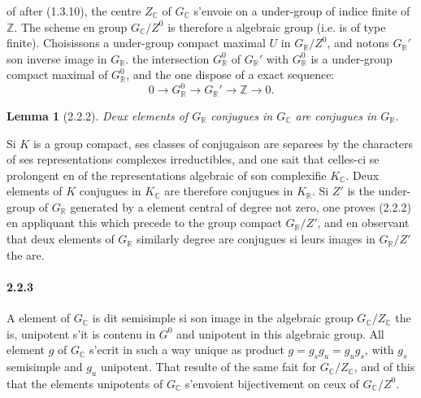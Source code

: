 \documentclass[12pt,a4paper]{article}
\theoremstyle{plain}
\newtheorem{lemma}[theorem]{Lemma}
\theoremstyle{definition}
\theoremstyle{remark}
\newcommand{\CC}{{\mathbb{C}}}
\newcommand{\RR}{{\mathbb{R}}}
\newcommand{\ZZ}{{\mathbb{Z}}}
\begin{document}
of after (1.3.10), the centre $Z_\CC$ of $G_\CC$ s'envoie on a under-group of indice finite of $\ZZ$. The scheme en group $G_\CC/Z^0$ is therefore a algebraic group (i.e. is of type finite). Choisissons a under-group compact maximal $U$ in $G_\RR/Z^0$, and notons $G_\RR'$ son inverse image in $G_\RR$. the intersection $G_\RR^0$ of $G_\RR'$ with $G_\RR^0$ is a under-group compact maximal of $G_\RR^0$, and the one dispose of a exact sequence:
\begin{equation}\label{eq:2.2.1.2}
0 \to G_\RR^0 \to G_\RR' \to \ZZ \to 0.
\end{equation}


\begin{lemma}[2.2.2]
Deux elements of $G_\RR$ conjugues in $G_\CC$ are conjugues in $G_\RR$.
\end{lemma}

Si $K$ is a group compact, ses classes of conjugaison are separees by the characters of ses representations complexes irreductibles, and one sait that celles-ci se prolongent en of the representations algebraic of son complexifie $K_\CC$. Deux elements of $K$ conjugues in $K_\CC$ are therefore conjugues in $K_\RR$. Si $Z'$ is the under-group of $G_\RR$ generated by a element central of degree not zero, one proves (2.2.2) en appliquant this which precede to the group compact $G_\RR/Z'$, and en observant that deux elements of $G_\RR$ similarly degree are conjugues si leurs images in $G_\RR/Z'$ the are.

\paragraph{2.2.3}
A element of $G_\CC$ is dit semisimple si son image in the algebraic group $G_\CC/Z_\CC$ the is, unipotent s'it is contenu in $G^0$ and unipotent in this algebraic group. All element $g$ of $G_\CC$ s'ecrit in such a way unique as product $g = g_s g_u = g_u g_s$, with $g_s$ semisimple and $g_u$ unipotent. That resulte of the same fait for $G_\CC/Z_\CC$, and of this that the elements unipotents of $G_\CC$ s'envoient bijectivement on ceux of $G_\CC/Z^0$.
\end{document}
